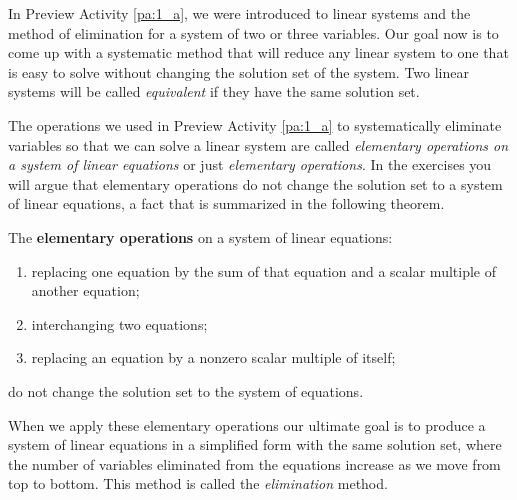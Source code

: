 \label{sec:solve_systems}

In Preview Activity \ref{pa:1_a}, we were introduced to linear systems and the method of elimination for a system of two or three variables. Our goal now is to come up with a systematic method that will reduce any linear system to one that is easy to solve without changing the solution set of the system. Two linear systems will be called \emph{equivalent} if they have the same solution set. 

The operations we used in Preview Activity \ref{pa:1_a} to systematically eliminate variables so that we can solve a linear system are called \emph{elementary operations on a system of linear equations} or just \emph{elementary operations}. In the exercises you will argue that elementary operations do not change the solution set to a system of linear equations, a fact that is summarized in the following theorem.

\begin{theorem} The \textbf{elementary operations} on a system of linear equations: 
\begin{enumerate}
\item replacing one equation by the sum of that equation and a scalar multiple of another equation;
\item interchanging two equations;
\item replacing an equation by a nonzero scalar multiple of itself;
\end{enumerate}
do not change the solution set to the system of equations.
\end{theorem}

When we apply these elementary operations our ultimate goal is to produce a system of linear equations in a simplified form with the same solution set, where the number of variables eliminated from the equations increase as we move from top to bottom. This method is called the \emph{elimination} method. 

